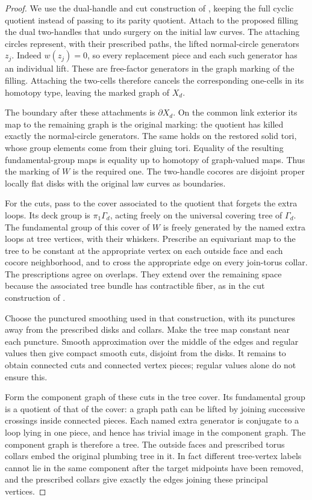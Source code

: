 \begin{proof}
We use the dual-handle and cut construction of \cite[Section~2.4]{PD},
keeping the full cyclic quotient instead of passing to its parity
quotient.  Attach to the proposed filling the dual two-handles that
undo surgery on the initial law curves.  The attaching circles
represent, with their prescribed paths, the lifted normal-circle
generators $z_j$.  Indeed $w(z_j)=0$, so every replacement piece and
each such generator has an individual lift.  These are free-factor
generators in the graph marking of the filling.  Attaching the
two-cells therefore cancels the corresponding one-cells in its
homotopy type, leaving the marked graph of $X_d$.

The boundary after these attachments is $\partial X_d$.  On the common
link exterior its map to the remaining graph is the original marking:
the quotient has killed exactly the normal-circle generators.  The
same holds on the restored solid tori, whose group elements come from
their gluing tori.  Equality of the resulting fundamental-group maps
is equality up to homotopy of graph-valued maps.  Thus the marking of
$W$ is the required one.  The two-handle cocores are disjoint proper
locally flat disks with the original law curves as boundaries.

For the cuts, pass to the cover associated to the quotient that forgets
the extra loops.  Its deck group is $\pi_1\Gamma_d$, acting freely on
the universal covering tree of $\Gamma_d$.  The fundamental group of
this cover of $W$ is freely generated by the named extra loops at tree
vertices, with their whiskers.  Prescribe an equivariant map to the
tree to be constant at the appropriate vertex on each outside face and
each cocore neighborhood, and to cross the appropriate edge on every
join-torus collar.  The prescriptions agree on overlaps.  They extend
over the remaining space because the associated tree bundle has
contractible fiber, as in the cut construction of \cite[Section~2.4]{PD}.

Choose the punctured smoothing used in that construction, with its
punctures away from the prescribed disks and collars.  Make the tree
map constant near each puncture.  Smooth approximation over the middle
of the edges and regular values then give compact smooth cuts,
disjoint from the disks.  It remains to obtain connected cuts and
connected vertex pieces; regular values alone do not ensure this.

Form the component graph of these cuts in the tree cover.  Its
fundamental group is a quotient of that of the cover: a graph path can
be lifted by joining successive crossings inside connected pieces.
Each named extra generator is conjugate to a loop lying in one piece,
and hence has trivial image in the component graph.  The component
graph is therefore a tree.  The
outside faces and prescribed torus collars embed the original plumbing
tree in it.  In fact different tree-vertex labels cannot lie in the
same component after the target midpoints have been removed, and the
prescribed collars give exactly the edges joining these principal
vertices.


\end{proof}
